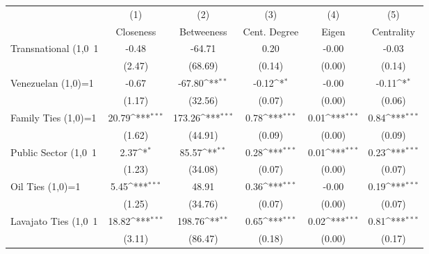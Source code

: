 {
\def\sym#1{\ifmmode^{#1}\else\(^{#1}\)\fi}
\begin{tabular}{l*{5}{c}}
\hline\hline
                    &\multicolumn{1}{c}{(1)}&\multicolumn{1}{c}{(2)}&\multicolumn{1}{c}{(3)}&\multicolumn{1}{c}{(4)}&\multicolumn{1}{c}{(5)}\\
                    &\multicolumn{1}{c}{Closeness}&\multicolumn{1}{c}{Betweeness}&\multicolumn{1}{c}{Cent. Degree}&\multicolumn{1}{c}{Eigen}&\multicolumn{1}{c}{Centrality}\\

Transnational (1,0~1&       -0.48         &      -64.71         &        0.20         &       -0.00         &       -0.03         \\
                    &      (2.47)         &     (68.69)         &      (0.14)         &      (0.00)         &      (0.14)         \\
Venezuelan (1,0)=1  &       -0.67         &      -67.80\sym{**} &       -0.12\sym{*}  &       -0.00         &       -0.11\sym{*}  \\
                    &      (1.17)         &     (32.56)         &      (0.07)         &      (0.00)         &      (0.06)         \\
Family Ties (1,0)=1 &       20.79\sym{***}&      173.26\sym{***}&        0.78\sym{***}&        0.01\sym{***}&        0.84\sym{***}\\
                    &      (1.62)         &     (44.91)         &      (0.09)         &      (0.00)         &      (0.09)         \\
Public Sector (1,0~1&        2.37\sym{*}  &       85.57\sym{**} &        0.28\sym{***}&        0.01\sym{***}&        0.23\sym{***}\\
                    &      (1.23)         &     (34.08)         &      (0.07)         &      (0.00)         &      (0.07)         \\
Oil Ties (1,0)=1    &        5.45\sym{***}&       48.91         &        0.36\sym{***}&       -0.00         &        0.19\sym{***}\\
                    &      (1.25)         &     (34.76)         &      (0.07)         &      (0.00)         &      (0.07)         \\
Lavajato Ties (1,0~1&       18.82\sym{***}&      198.76\sym{**} &        0.65\sym{***}&        0.02\sym{***}&        0.81\sym{***}\\
                    &      (3.11)         &     (86.47)         &      (0.18)         &      (0.00)         &      (0.17)         \\

\end{tabular}}
